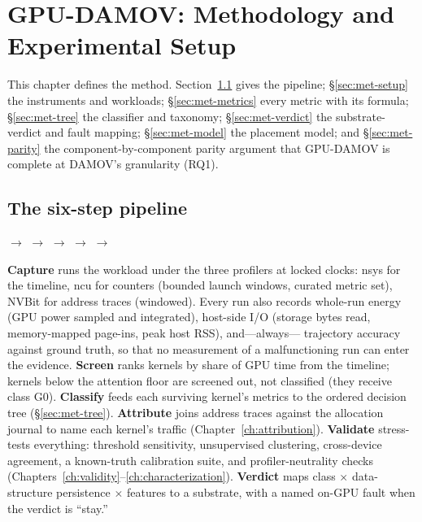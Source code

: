 \chapter{GPU-DAMOV: Methodology and Experimental Setup}
\label{ch:method}

This chapter defines the method. Section~\ref{sec:met-pipeline} gives the
pipeline; \S\ref{sec:met-setup} the instruments and workloads;
\S\ref{sec:met-metrics} every metric with its formula;
\S\ref{sec:met-tree} the classifier and taxonomy; \S\ref{sec:met-verdict}
the substrate-verdict and fault mapping; \S\ref{sec:met-model} the placement
model; and \S\ref{sec:met-parity} the component-by-component parity argument
that GPU-DAMOV is complete at DAMOV's granularity (RQ1).

\section{The six-step pipeline}
\label{sec:met-pipeline}

\begin{center}
 $\rightarrow$  $\rightarrow$ 
$\rightarrow$  $\rightarrow$  $\rightarrow$
\end{center}

\textbf{Capture} runs the workload under the three profilers at locked
clocks: nsys for the timeline, ncu for counters (bounded launch windows,
curated metric set), NVBit for address traces (windowed). Every run also
records whole-run energy (GPU power sampled and integrated), host-side I/O
(storage bytes read, memory-mapped page-ins, peak host RSS), and---always---
trajectory accuracy against ground truth, so that no measurement of a
malfunctioning run can enter the evidence. \textbf{Screen} ranks kernels by
share of GPU time from the timeline; kernels below the attention floor are
screened out, not classified (they receive class G0). \textbf{Classify}
feeds each surviving kernel's metrics to the ordered decision tree
(\S\ref{sec:met-tree}). \textbf{Attribute} joins address traces against the
allocation journal to name each kernel's traffic
(Chapter~\ref{ch:attribution}). \textbf{Validate} stress-tests everything:
threshold sensitivity, unsupervised clustering, cross-device agreement, a
known-truth calibration suite, and profiler-neutrality checks
(Chapters~\ref{ch:validity}--\ref{ch:characterization}). \textbf{Verdict}
maps class $\times$ data-structure persistence $\times$ features to a
substrate, with a named on-GPU fault when the verdict is ``stay.''

